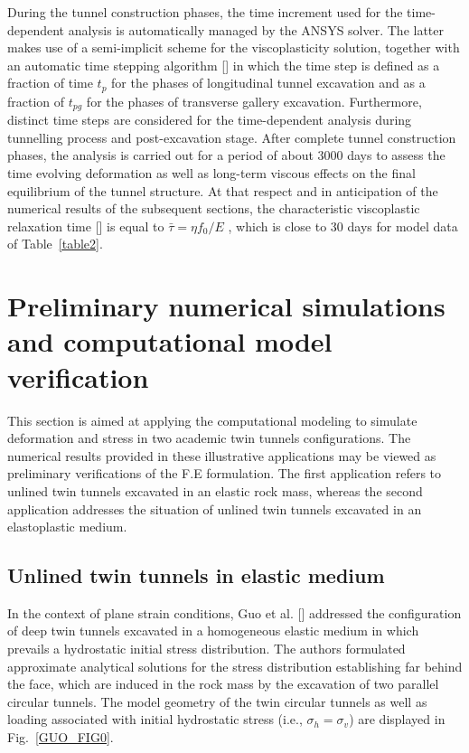\documentclass[a4paper,fleqn]{cas-sc}
\begin{document}
\FloatBarrier
During the tunnel construction phases, the time increment used for the time-dependent analysis is automatically managed by the ANSYS solver. The latter makes use of a semi-implicit scheme for the viscoplasticity solution, together with an automatic time stepping algorithm [] in which the time step is defined as a fraction of time $t_p$ for the phases of longitudinal tunnel excavation and as a fraction of $t_{pg}$ for the phases of transverse gallery excavation. Furthermore, distinct time steps are considered for the time-dependent analysis during tunnelling process and post-excavation stage. After complete tunnel construction phases, the analysis is carried out for a period of about $3000$ days to assess the time evolving deformation as well as long-term viscous effects on the final equilibrium of the tunnel structure. At that respect and in anticipation of the numerical results of the subsequent sections, the characteristic viscoplastic relaxation time [] is equal to $\bar{\tau} = \eta f_0 / E$ , which is close to $30$ days for model data of Table~\ref{table2}.

\section{Preliminary numerical simulations and computational model verification}\label{}

This section is aimed at applying the computational modeling to simulate deformation and stress in two academic twin tunnels configurations. The numerical results provided in these illustrative applications may be viewed as preliminary verifications of the F.E formulation. The first application refers to unlined twin tunnels excavated in an elastic rock mass, whereas the second application addresses the situation of unlined twin tunnels excavated in an elastoplastic medium.

\subsection{Unlined twin tunnels in elastic medium}

In the context of plane strain conditions, Guo et al. [] addressed the configuration of deep twin tunnels excavated in a homogeneous elastic medium in which prevails a hydrostatic initial stress distribution. The authors formulated approximate analytical solutions for the stress distribution establishing far behind the face, which are induced in the rock mass by the excavation of two parallel circular tunnels. The model geometry of the twin circular tunnels as well as loading associated with initial hydrostatic stress (i.e., $\sigma_h = \sigma_v$) are displayed in Fig.~\ref{GUO_FIG0}.
\end{document}
